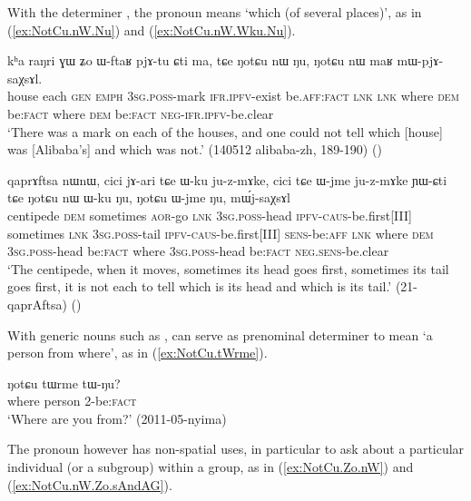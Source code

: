 With the determiner , the pronoun  means `which (of several places)', as in (\ref{ex:NotCu.nW.Nu}) and (\ref{ex:NotCu.nW.Wku.Nu}).

\begin{exe}
\ex \label{ex:NotCu.nW.Nu}
\gll kʰa raŋri ɣɯ ʑo ɯ-ftaʁ pjɤ-tu ɕti ma, tɕe ŋotɕu nɯ ŋu, ŋotɕu nɯ maʁ mɯ-pjɤ-saχsɤl. \\
house each \textsc{gen} \textsc{emph} \textsc{3sg}.\textsc{poss}-mark \textsc{ifr}.\textsc{ipfv}-exist be.\textsc{aff}:\textsc{fact} \textsc{lnk} \textsc{lnk} where \textsc{dem} be:\textsc{fact}  where \textsc{dem} be:\textsc{fact} \textsc{neg}-\textsc{ifr}.\textsc{ipfv}-be.clear \\
\glt `There was a mark on each of the houses, and one could not tell which [house] was [Alibaba's] and which was not.' (140512 alibaba-zh, 189-190) ()
\end{exe} 

\begin{exe}
\ex \label{ex:NotCu.nW.Wku.Nu}
\gll qaprɤftsa nɯnɯ, cici jɤ-ari tɕe ɯ-ku ju-z-mɤke, cici tɕe ɯ-jme ju-z-mɤke ɲɯ-ɕti tɕe ŋotɕu nɯ ɯ-ku ŋu, ŋotɕu ɯ-jme ŋu, mɯ́j-saχsɤl \\
centipede \textsc{dem} sometimes \textsc{aor}-go \textsc{lnk} \textsc{3sg}.\textsc{poss}-head \textsc{ipfv}-\textsc{caus}-be.first[III] sometimes \textsc{lnk} \textsc{3sg}.\textsc{poss}-tail \textsc{ipfv}-\textsc{caus}-be.first[III] \textsc{sens}-be:\textsc{aff} \textsc{lnk} where \textsc{dem} \textsc{3sg}.\textsc{poss}-head be:\textsc{fact} where \textsc{3sg}.\textsc{poss}-head be:\textsc{fact} \textsc{neg}.\textsc{sens}-be.clear \\
\glt `The centipede, when it moves, sometimes its head goes first, sometimes its tail goes first, it is not each to tell which is its head and which is its tail.' (21-qaprAftsa)
()
\end{exe} 


With generic nouns such as ,  can serve as prenominal determiner to mean `a person from where', as in (\ref{ex:NotCu.tWrme}).

\begin{exe}
\ex \label{ex:NotCu.tWrme}
\gll ŋotɕu tɯrme tɯ-ŋu? \\
where person 2-be:\textsc{fact} \\
\glt `Where are you from?' (2011-05-nyima)
\end{exe} 

The pronoun  however has non-spatial uses, in particular to ask about a particular individual (or a subgroup) within a group, as in (\ref{ex:NotCu.Zo.nW}) and (\ref{ex:NotCu.nW.Zo.sAndAG}).

